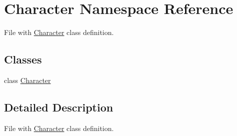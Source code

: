 \hypertarget{namespaceCharacter}{\section{\-Character \-Namespace \-Reference}
\label{namespaceCharacter}
}


\-File with \hyperlink{namespaceCharacter}{\-Character} class definition.  


\subsection*{\-Classes}
\begin{DoxyCompactItemize}
\item 
class \hyperlink{classCharacter_1_1Character}{\-Character}
\end{DoxyCompactItemize}


\subsection{\-Detailed \-Description}
\-File with \hyperlink{namespaceCharacter}{\-Character} class definition. 